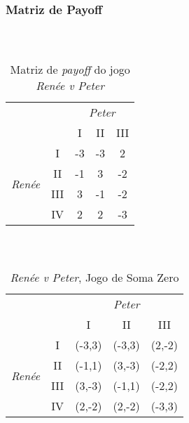 \subsubsection*{Matriz de Payoff}
\begin{frame}
\frametitle{\subsecname\\}
\begin{table}[ht]
\centering
\begin{tabular}{cc|ccc}
\hline
 &  & \multicolumn{3}{c}{\emph{Peter}}\tabularnewline
 &  & I & II & III\tabularnewline
\hline
\multirow{4}{*}{\begin{turn}{90}
\emph{Renée}
\end{turn}} & I & -3 & -3 & 2\tabularnewline
 & II & -1 & 3 & -2\tabularnewline
 & III & 3 & -1 & -2\tabularnewline
 & IV & 2 & 2 & -3\tabularnewline
\hline
\end{tabular}
\caption{Matriz de \emph{payoff} do jogo \emph{Renée v Peter}}
\end{table}
\end{frame}

\begin{frame}
\frametitle{\subsecname\\}
\begin{table}[ht]
\centering
\begin{tabular}{cc|ccc}
\hline
 &  & \multicolumn{3}{c}{\emph{Peter}}\tabularnewline
 &  & I & II & III\tabularnewline
\hline
\multirow{4}{*}{\begin{turn}{90}
\emph{Renée}
\end{turn}} & I & (-3,3) & (-3,3) & (2,-2)\tabularnewline
 & II & (-1,1) & (3,-3) & (-2,2)\tabularnewline
 & III & (3,-3) & (-1,1) & (-2,2)\tabularnewline
 & IV & (2,-2) & (2,-2) & (-3,3)\tabularnewline
\hline
\end{tabular}
\caption{\emph{Renée v Peter}, Jogo de Soma Zero}
\end{table}
\end{frame}

